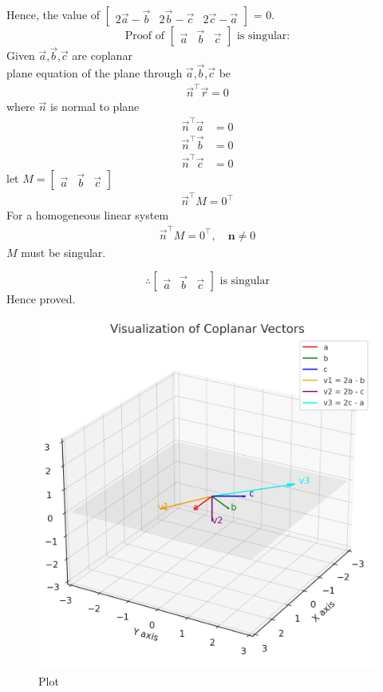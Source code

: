 \documentclass[journal]{IEEEtran}
\begin{document}
Hence, the value of $\begin{bmatrix} 2\vec{a} - \vec{b} & 2\vec{b} - \vec{c} & 2\vec{c} - \vec{a}\end{bmatrix}$ = 0.\\

\[\text {Proof of } \begin{bmatrix} \vec{a} & \vec{b} & \vec{c} \end{bmatrix} \text{ is singular:}\]
Given $\vec{a}$,$\vec{b}$,$\vec{c}$ are coplanar\\
plane equation of the plane through  $\vec{a}$,$\vec{b}$,$\vec{c}$ be 
\begin{align}
\vec{n}^\top \vec{r} = 0
\end{align}
where $\vec{n}$ is normal to plane
\begin{align}
\vec{n}^\top \Vec{a} &= 0 \\ 
\vec{n}^\top \vec{b} &= 0 \\
\vec{n}^\top \vec{c} &= 0
\end{align}
let $M = \begin{bmatrix} \vec{a} & \vec{b} & \vec{c} \end{bmatrix}$
\begin{align}
\vec{n}^\top M = 0^\top
\end{align}
For a homogeneous linear system
\begin{align}
\vec{n}^\top M = 0^\top, \quad \mathbf{n} \neq 0
\end{align}
$M$ must be singular.

\[\therefore \begin{bmatrix} \vec{a} & \vec{b} & \vec{c}  \end{bmatrix} \text{ is singular}\]
Hence proved.\\

\begin{figure}[H]
    \centering
    \includegraphics[width=0.75\columnwidth]{figs/graph-1.png}
    \caption{Plot}
    \label{fig:placeholder}
\end{figure}
\end{document}
